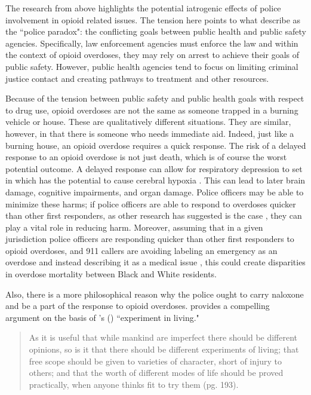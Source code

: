 The research from above highlights the potential iatrogenic effects of police involvement in opioid related issues. The tension here points to what \textcite{carroll_police_2023} describe as the ``police paradox": the conflicting goals between public health and public safety agencies. Specifically, law enforcement agencies must enforce the law and within the context of opioid overdoses, they may rely on arrest to achieve their goals of public safety. However, public health agencies tend to focus on limiting criminal justice contact and creating pathways to treatment and other resources.

Because of the tension between public safety and public health goals with respect to drug use, opioid overdoses are not the same as someone trapped in a burning vehicle or house. These are qualitatively different situations. They are similar, however, in that there is someone who needs immediate aid. Indeed, just like a burning house, an opioid overdose requires a quick response. The risk of a delayed response to an opioid overdose is not just death, which is of course the worst potential outcome. A delayed response can allow for respiratory depression to set in which has the potential to cause cerebral hypoxia \parencite{winstanley_neurocognitive_2021}. This can lead to later brain damage, cognitive impairments, and organ damage. Police officers may be able to minimize these harms; if police officers are able to respond to overdoses quicker than other first responders, as other research has suggested is the case \parencite{pourtaher_naloxone_2022, white_leveraging_2022}, they can play a vital role in reducing harm. Moreover, assuming that in a given jurisdiction police officers are responding quicker than other first responders to opioid overdoses, and 911 callers are avoiding labeling an emergency as an overdose and instead describing it as a medical issue \parencite{atkins_disparities_2024}, this could create disparities in overdose mortality between Black and White residents. 

Also, there is a more philosophical reason why the police ought to carry naloxone and be a part of the response to opioid overdoses. \textcite{monaghan_broken_2022} provides a compelling argument on the basis of \citeauthor{mill_liberty_1998}'s (\citeyear{mill_liberty_1998}) ``experiment in living." 

\begin{quote}
As it is useful that while mankind are imperfect there should be different opinions, so is it that there should be different experiments of living; that free scope should be given to varieties of character, short of injury to others; and that the worth of different modes of life should be proved practically, when anyone thinks fit to try them (pg. 193).
\end{quote}

